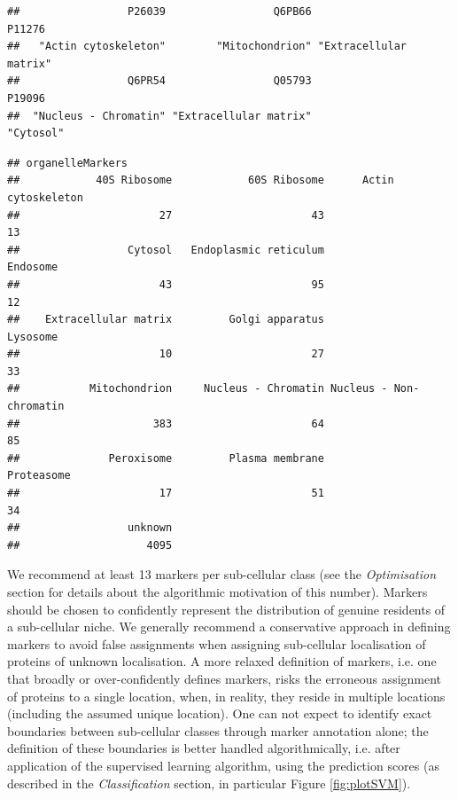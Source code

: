 \begin{knitrout}
\color{fgcolor}\begin{kframe}
\begin{alltt}
 \hlkwb{<-} \hlstd{(} \hlstd{=} \hlstd{)}
\end{alltt}
\begin{verbatim}
##                 P26039                 Q6PB66                 P11276 
##   "Actin cytoskeleton"        "Mitochondrion" "Extracellular matrix" 
##                 Q6PR54                 Q05793                 P19096 
##  "Nucleus - Chromatin" "Extracellular matrix"              "Cytosol"
\end{verbatim}
\begin{alltt}
 \hlkwb{<-} 
\end{alltt}


{\ttfamily\noindent\itshape\color{messagecolor}{\#\# Markers in data: 937 out of 5032}}\begin{verbatim}
## organelleMarkers
##            40S Ribosome            60S Ribosome      Actin cytoskeleton 
##                      27                      43                      13 
##                 Cytosol   Endoplasmic reticulum                Endosome 
##                      43                      95                      12 
##    Extracellular matrix         Golgi apparatus                Lysosome 
##                      10                      27                      33 
##           Mitochondrion     Nucleus - Chromatin Nucleus - Non-chromatin 
##                     383                      64                      85 
##              Peroxisome         Plasma membrane              Proteasome 
##                      17                      51                      34 
##                 unknown 
##                    4095
\end{verbatim}
\end{kframe}
\end{knitrout}

We recommend at least 13 markers per sub-cellular class (see the
\textit{Optimisation} section for details about the algorithmic
motivation of this number). Markers should be chosen to confidently
represent the distribution of genuine residents of a sub-cellular
niche. We generally recommend a conservative approach in defining
markers to avoid false assignments when assigning sub-cellular
localisation of proteins of unknown localisation. A more relaxed
definition of markers, i.e. one that broadly or over-confidently
defines markers, risks the erroneous assignment of proteins to a
single location, when, in reality, they reside in multiple locations
(including the assumed unique location). One can not expect to
identify exact boundaries between sub-cellular classes through marker
annotation alone; the definition of these boundaries is better handled
algorithmically, i.e. after application of the supervised learning
algorithm, using the prediction scores (as described in the
\textit{Classification} section, in particular Figure
\ref{fig:plotSVM}).

